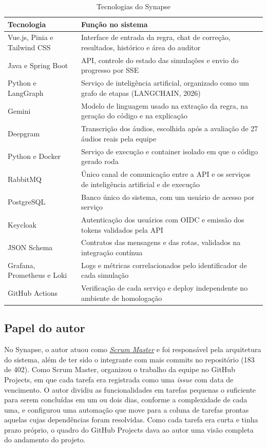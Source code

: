 \documentclass[12pt,a4paper]{article}
\newcommand{\termo}[2]{\hyperlink{gls:#1}{\textit{#2}}}
\newcommand{\fonte}[1]{\par\vspace{2pt}{\noindent\hspace{0.6cm}Fonte: #1\par}}
\newcommand{\ano}{2026}
\begin{document}
\begin{table}[tbp]
\centering
\caption{Tecnologias do Synapse}
\label{tab:tecnologias}
\renewcommand{\arraystretch}{1.1}
\begin{tabular}{p{4.6cm} p{10.4cm}}
\toprule
\textbf{Tecnologia} & \textbf{Função no sistema} \\
\midrule
Vue.js, Pinia e Tailwind CSS & Interface de entrada da regra, chat de correção, resultados, histórico e área do auditor \\
Java e Spring Boot & API, controle do estado das simulações e envio do progresso por SSE \\
Python e LangGraph & Serviço de inteligência artificial, organizado como um grafo de etapas (LANGCHAIN, 2026) \\
Gemini & Modelo de linguagem usado na extração da regra, na geração do código e na explicação \\
Deepgram & Transcrição dos áudios, escolhida após a avaliação de 27 áudios reais pela equipe \\
Python e Docker & Serviço de execução e container isolado em que o código gerado roda \\
RabbitMQ & Único canal de comunicação entre a API e os serviços de inteligência artificial e de execução \\
PostgreSQL & Banco único do sistema, com um usuário de acesso por serviço \\
Keycloak & Autenticação dos usuários com OIDC e emissão dos tokens validados pela API \\
JSON Schema & Contratos das mensagens e das rotas, validados na integração contínua \\
Grafana, Prometheus e Loki & Logs e métricas correlacionados pelo identificador de cada simulação \\
GitHub Actions & Verificação de cada serviço e deploy independente no ambiente de homologação \\
\bottomrule
\end{tabular}
\fonte{Elaborado por GARCIA, (\ano).}
\end{table}

\subsection{Papel do autor}

No Synapse, o autor atuou como \termo{sm}{Scrum Master} e foi responsável pela arquitetura do sistema, além de ter sido o integrante com mais commits no repositório (183 de 402). Como Scrum Master, organizou o trabalho da equipe no GitHub Projects, em que cada tarefa era registrada como uma \textit{issue} com data de vencimento. O autor dividiu as funcionalidades em tarefas pequenas o suficiente para serem concluídas em um ou dois dias, conforme a complexidade de cada uma, e configurou uma automação que move para a coluna de tarefas prontas aquelas cujas dependências foram resolvidas. Como cada tarefa era curta e tinha prazo próprio, o quadro do GitHub Projects dava ao autor uma visão completa do andamento do projeto.
\end{document}
